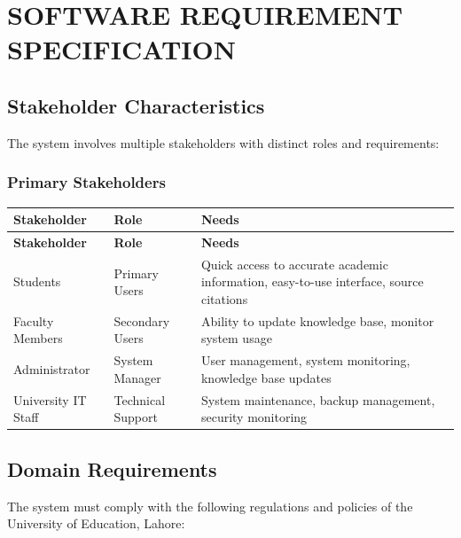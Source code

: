 \documentclass[12pt,a4paper]{book}
\numberwithin{table}{chapter}
\numberwithin{figure}{chapter}
\numberwithin{equation}{chapter}
\begin{document}
\clearpage

\chapter{SOFTWARE REQUIREMENT SPECIFICATION}

\section{Stakeholder Characteristics}

The system involves multiple stakeholders with distinct roles and requirements:

\subsection{Primary Stakeholders}

\begin{longtable}{|p{1.5in}|p{2in}|p{2in}|}
\hline
\textbf{Stakeholder} & \textbf{Role} & \textbf{Needs}\\
\hline
\endfirsthead
\hline
\textbf{Stakeholder} & \textbf{Role} & \textbf{Needs}\\
\hline
\endhead
\hline
Students & Primary Users & Quick access to accurate academic information, easy-to-use interface, source citations\\
\hline
Faculty Members & Secondary Users & Ability to update knowledge base, monitor system usage\\
\hline
Administrator & System Manager & User management, system monitoring, knowledge base updates\\
\hline
University IT Staff & Technical Support & System maintenance, backup management, security monitoring\\
\hline
\end{longtable}

\section{Domain Requirements}

The system must comply with the following regulations and policies of the University of Education, Lahore:
\end{document}
